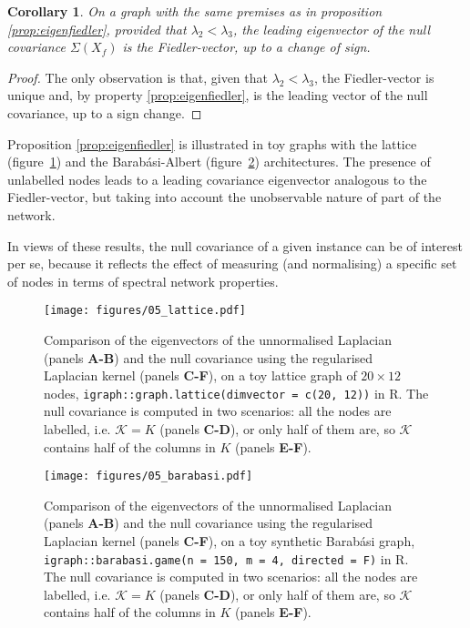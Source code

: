 \documentclass[12pt]{article}  %
\newtheorem{corollary}[theorem]{Corollary}
\begin{document}
\begin{corollary}
On a graph with the same premises as in proposition \ref{prop:eigenfiedler}, provided that $\lambda_2 < \lambda_3$, the leading eigenvector of the null covariance $\Sigma(X_f)$ is the Fiedler-vector, up to a change of sign. 
\end{corollary}

\begin{proof}
The only observation is that, given that $\lambda_2 < \lambda_3$, the Fiedler-vector is unique and, by property \ref{prop:eigenfiedler}, is the leading vector of the null covariance, up to a sign change. 
\end{proof}

Proposition \ref{prop:eigenfiedler} is illustrated in toy graphs with the lattice (figure~\ref{fig:lattice}) and the Barab\'asi-Albert (figure~\ref{fig:barabasi}) architectures.
The presence of unlabelled nodes leads to a leading covariance eigenvector analogous to the Fiedler-vector, but taking into account the unobservable nature of part of the network. 

In views of these results, the null covariance of a given instance can be of interest per se, because it reflects the effect of measuring (and normalising) a specific set of nodes in terms of spectral network properties.

\begin{figure}[th]
\centering
\texttt{[image: figures/05\_lattice.pdf]}
\caption{Comparison of the eigenvectors of the unnormalised Laplacian (panels \textbf{A-B}) and the null covariance using the regularised Laplacian kernel (panels \textbf{C-F}), on a toy lattice graph of $20 \times 12$ nodes, \texttt{igraph::graph.lattice(dimvector = c(20, 12))} in R.
The null covariance is computed in two scenarios: all the nodes are labelled, i.e. $\mathcal{K} = K$ (panels \textbf{C-D}), or only half of them are, so $\mathcal{K}$ contains half of the columns in $K$ (panels \textbf{E-F}). 
}
\label{fig:lattice}
\end{figure}

\begin{figure}[th]
\centering
\texttt{[image: figures/05\_barabasi.pdf]}
\caption{Comparison of the eigenvectors of the unnormalised Laplacian (panels \textbf{A-B}) and the null covariance using the regularised Laplacian kernel (panels \textbf{C-F}), on a toy synthetic Barab\'asi graph, \texttt{igraph::barabasi.game(n = 150, m = 4, directed = F)} in R.
The null covariance is computed in two scenarios: all the nodes are labelled, i.e. $\mathcal{K} = K$ (panels \textbf{C-D}), or only half of them are, so $\mathcal{K}$ contains half of the columns in $K$ (panels \textbf{E-F}). 
}
\label{fig:barabasi}
\end{figure}

\clearpage


\end{document}
